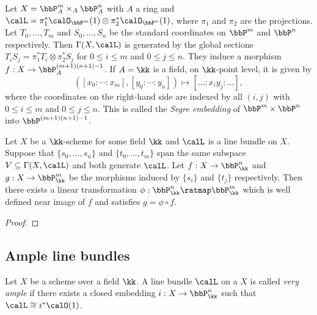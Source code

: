     \begin{example}\label{eg:Segre_embedding}
        Let \(X=\bbP^m_A \times_A \bbP^n_A\) with \(A\) a ring and \(\calL=\pi_1^*\calO_{\bbP^m}(1) \otimes \pi_2^*\calO_{\bbP^n}(1)\), where \(\pi_1\) and \(\pi_2\) are the projections.
        Let \(T_0,\ldots,T_m\) and \(S_0,\ldots,S_n\) be the standard coordinates on \(\bbP^m\) and \(\bbP^n\) respectively.
        Then \(\Gamma(X,\calL)\) is generated by the global sections \(T_i S_j = \pi_1^*T_i \otimes \pi_2^*S_j\) for \(0\leq i \leq m\) and \(0\leq j \leq n\).
        They induce a morphism \(f:X\to \bbP^{(m+1)(n+1)-1}_A\).
        If \(A=\kk\) is a field, on \(\kk\)-point level, it is given by
        \[ ([x_0:\cdots:x_m],[y_0:\cdots:y_n]) \mapsto [\ldots:x_i y_j:\ldots], \]
        where the coordinates on the right-hand side are indexed by all \((i,j)\) with \(0\leq i \leq m\) and \(0\leq j \leq n\).
        This is called the \emph{Segre embedding} of \(\bbP^m \times \bbP^n\) into \(\bbP^{(m+1)(n+1)-1}\).
    \end{example}

    
    \begin{proposition}\label{prop:different_choices_of_sections_give_different_morphisms_which_differ_by_a_linear_transformation}
        Let \(X\) be a \(\kk\)-scheme for some field \(\kk\) and \(\calL\) is a line bundle on \(X\).
        Suppose that \(\{s_0,\ldots,s_n\}\) and \(\{t_0,\ldots,t_m\}\) span the same subspace \(V\subseteq \Gamma(X,\calL)\) and both generate \(\calL\).
        Let \(f:X\to \bbP^n_\kk\) and \(g:X\to \bbP^m_\kk\) be the morphisms induced by \(\{s_i\}\) and \(\{t_j\}\) respectively.
        Then there exists a linear transformation \(\phi:\bbP^n_\kk \ratmap \bbP^m_\kk\) which is well defined near image of \(f\) and satisfies \(g=\phi \circ f\).
    \end{proposition}
    \begin{proof}
    \end{proof}


\subsection{Ample line bundles}

    \begin{definition}\label{def:very_ample_line_bundle}
        Let \(X\) be a scheme over a field \(\kk\).
        A line bundle \(\calL\) on a \(X\) is called \emph{very ample} if there exists a closed embedding \(i:X\to \bbP^n_\kk\) such that \(\calL\cong i^*\calO(1)\).
    \end{definition}

